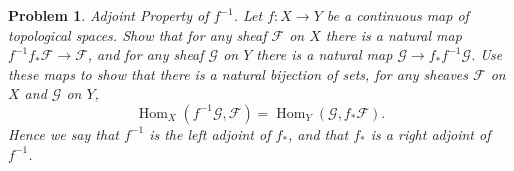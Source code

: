 \documentclass[12pt,letterpaper]{article}
\newtheorem{problem}{Problem}[section]
\theoremstyle{definition}
\theoremstyle{remark}
\numberwithin{equation}{section}
\numberwithin{figure}{problem}
\DeclareMathOperator{\Hom}{Hom}
\begin{document}
\begin{problem}
  \emph{Adjoint Property of $f^{-1}$}. Let $f\colon X \to Y$ be a continuous map of topological spaces. Show that for any sheaf $\mathscr{F}$ on $X$ there is a natural map $f^{-1}f_*\mathscr{F} \to \mathscr{F}$, and for any sheaf $\mathscr{G}$ on $Y$ there is a natural map $\mathscr{G} \to f_*f^{-1}\mathscr{G}$. Use these maps to show that there is a natural bijection of sets, for any sheaves $\mathscr{F}$ on $X$ and $\mathscr{G}$ on $Y$,
  \begin{equation*}
    \Hom_X(f^{-1}\mathscr{G},\mathscr{F}) = \Hom_Y(\mathscr{G},f_*\mathscr{F}).
  \end{equation*}
  Hence we say that $f^{-1}$ is the \emph{left adjoint} of $f_*$, and that $f_*$ is a \emph{right adjoint} of $f^{-1}$.
\end{problem}
\end{document}
